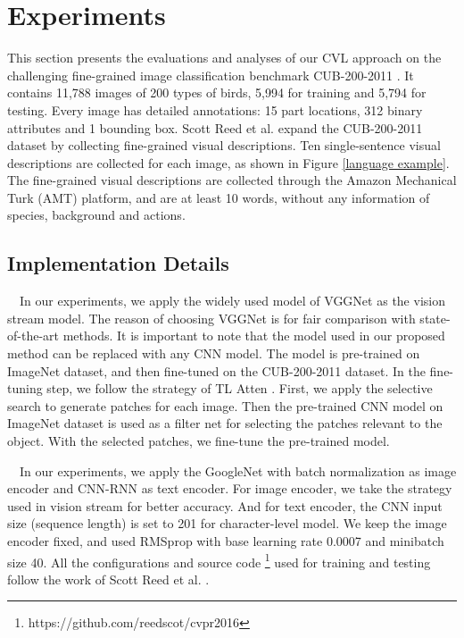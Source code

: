 \documentclass[10pt,twocolumn,letterpaper]{article}
\begin{document}
\section{Experiments}
This section presents the evaluations and analyses of our CVL approach on the challenging fine-grained image classification benchmark CUB-200-2011 \cite{cub2011}. It contains 11,788 images of 200 types of birds, 5,994 for training and 5,794 for testing. Every image has detailed annotations: 15 part locations, 312 binary attributes and 1 bounding box. Scott Reed et al. \cite{deeprepresentations} expand the CUB-200-2011 dataset by collecting fine-grained visual descriptions. Ten single-sentence visual descriptions are collected for each image, as shown in Figure \ref{language example}. The fine-grained visual descriptions are collected through the Amazon Mechanical Turk (AMT) platform, and are at least 10 words, without any information of species, background and actions. 

\subsection{Implementation Details}
 \ \ In our experiments, we apply the widely used model of VGGNet \cite{vgg} as the vision stream model. The reason of choosing VGGNet is for fair comparison with state-of-the-art methods. It is important to note that the model used in our proposed method can be replaced with any CNN model. The model is pre-trained on ImageNet dataset, and then fine-tuned on the CUB-200-2011 dataset. In the fine-tuning step, we follow the strategy of TL Atten \cite{twoattention}. First, we apply the selective search \cite{uijlings2013selective} to generate patches for each image. Then the pre-trained CNN model on ImageNet dataset is used as a filter net for selecting the patches relevant to the object. With the selected patches, we fine-tune the pre-trained model.

\par
{} \ \ In our experiments, we apply the GoogleNet \cite{googlenet} with batch normalization \cite{ioffe2015batch} as image encoder and CNN-RNN \cite{deeprepresentations} as text encoder. For image encoder, we take the strategy used in vision stream for better accuracy. And for text encoder, the CNN input size (sequence length) is set to 201 for character-level model. We keep the image encoder fixed, and used RMSprop with base learning rate 0.0007 and minibatch size 40. All the configurations and source code \footnote{https://github.com/reedscot/cvpr2016} used for training and testing follow the work of Scott Reed et al. \cite{deeprepresentations}.  
\end{document}
